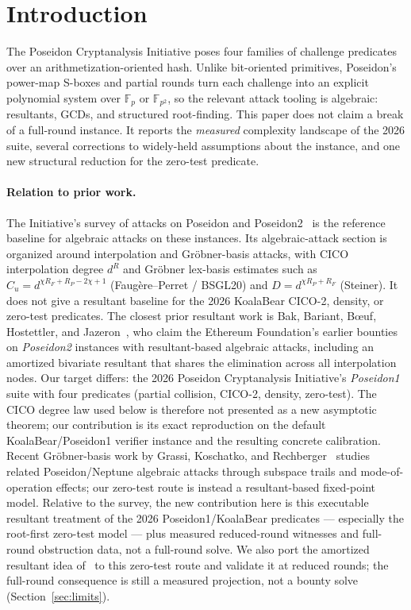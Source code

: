 \documentclass[11pt]{article}
\newcommand{\Fp}{\mathbb{F}_p}
\newcommand{\Fpp}{\mathbb{F}_{p^2}}
\newcommand{\RF}{R_F}
\newcommand{\RP}{R_P}
\theoremstyle{plain}
\begin{document}
\section{Introduction}
The Poseidon Cryptanalysis Initiative poses four families of challenge predicates
over an arithmetization-oriented hash. Unlike bit-oriented primitives, Poseidon's
power-map S-boxes and partial rounds turn each challenge into an explicit polynomial
system over $\Fp$ or $\Fpp$, so the relevant attack tooling is algebraic:
resultants, GCDs, and structured root-finding. This paper does not claim a break of
a full-round instance. It reports the \emph{measured} complexity landscape of
the 2026 suite, several corrections to widely-held assumptions about the instance,
and one new structural reduction for the zero-test predicate.

\paragraph{Relation to prior work.} The Initiative's survey of attacks on
Poseidon and Poseidon2~\cite{survey2024} is the reference baseline for algebraic
attacks on these instances. Its algebraic-attack section is organized around interpolation and
Gr\"obner-basis attacks, with CICO interpolation degree $d^R$ and Gr\"obner
lex-basis estimates such as $C_u=d^{\chi \RF+\RP-2\chi+1}$ (Faug\`ere--Perret /
BSGL20) and $D=d^{\chi\RP+\RF}$ (Steiner). It does not give a resultant baseline
for the 2026 KoalaBear CICO-2, density, or zero-test predicates. The closest
prior resultant work is Bak,
Bariant, B{\oe}uf, Hostettler, and Jazeron~\cite{cico2026}, who claim the Ethereum
Foundation's earlier bounties on \emph{Poseidon2} instances with resultant-based
algebraic attacks, including an amortized bivariate resultant that shares the
elimination across all interpolation nodes. Our target differs: the 2026 Poseidon
Cryptanalysis Initiative's \emph{Poseidon1} suite with four predicates (partial
collision, CICO-2, density, zero-test). The CICO degree law used below is therefore
not presented as a new asymptotic theorem; our contribution is its exact
reproduction on the default KoalaBear/Poseidon1 verifier instance and the resulting
concrete calibration. Recent Gr\"obner-basis work by Grassi, Koschatko, and
Rechberger~\cite{gbsubspace} studies related Poseidon/Neptune algebraic attacks
through subspace trails and mode-of-operation effects; our zero-test route is
instead a resultant-based fixed-point model. Relative to the survey, the
new contribution here is this executable resultant treatment of the 2026
Poseidon1/KoalaBear predicates --- especially the root-first zero-test model ---
plus measured reduced-round witnesses and full-round obstruction data, not a
full-round solve. We also port the amortized resultant idea
of~\cite{cico2026} to this zero-test route and validate it at reduced rounds; the
full-round consequence is still a measured projection, not a bounty solve
(Section~\ref{sec:limits}).
\end{document}
